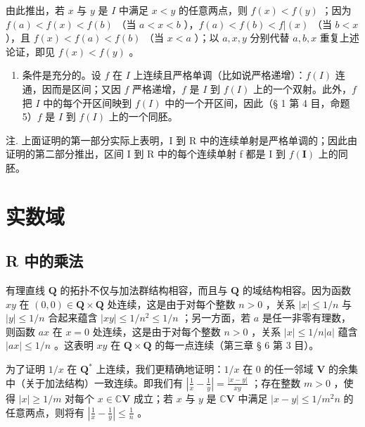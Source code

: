 由此推出，若 \(x\) 与 \(y\) 是 \(I\) 中满足 \(x < y\) 的任意两点，则 \(f(x) < f(y)\) ；因为 \(f(a) < f(x) < f(b)\) （当 \(a < x < b\) ），\(f(a) < f(b) < f|(x)\) （当 \(b < x\) ），且 \(f(x) < f(a) < f(b)\) （当 \(x < a\) ）；以 \(a, x, y\) 分别代替 \(a, b, x\) 重复上述论证，即见 \(f(x) < f(y)\) 。

\begin{enumerate}
\def\labelenumi{\arabic{enumi})}
\setcounter{enumi}{1}
\tightlist
\item
  条件是充分的。设 \(f\) 在 \(I\) 上连续且严格单调（比如说严格递增）：\(f(I)\) 连通，因而是区间；又因 \(f\) 严格递增，\(f\) 是 \(I\) 到 \(f(I)\) 上的一个双射。此外，\(f\) 把 \(I\) 中的每个开区间映到 \(f(I)\) 中的一个开区间，因此（§ 1 第 4 目，命题 5）\(f\) 是 \(I\) 到 \(f(I)\) 上的一个同胚。
\end{enumerate}

注. 上面证明的第一部分实际上表明，I 到 R 中的连续单射是严格单调的；因此由证明的第二部分推出，区间 I 到 R 中的每个连续单射 f 都是 I 到 \(f(\mathbf{I})\) 上的同胚。

\section{实数域}

\subsection{R 中的乘法}

有理直线 \(\mathbf{Q}\) 的拓扑不仅与加法群结构相容，而且与 \(\mathbf{Q}\) 的域结构相容。因为函数 \(xy\) 在 \((0, 0) \in \mathbf{Q} \times \mathbf{Q}\) 处连续，这是由于对每个整数 \(n > 0\) ，关系 \(|x| \leqslant 1/n\) 与 \(|y| \leqslant 1/n\) 合起来蕴含 \(|xy| \leqslant 1/n^2 \leqslant 1/n\) ；另一方面，若 \(a\) 是任一非零有理数，则函数 \(ax\) 在 \(x = 0\) 处连续，这是由于对每个整数 \(n > 0\) ，关系 \(|x| \leqslant 1/n |a|\) 蕴含 \(|ax| \leqslant 1/n\) 。这表明 \(xy\) 在 \(\mathbf{Q} \times \mathbf{Q}\) 的每一点连续（第三章 § 6 第 3 目）。

为了证明 \(1 / x\) 在 \(\mathbf{Q}^*\) 上连续，我们更精确地证明：\(1 / x\) 在 0 的任一邻域 \(\mathbf{V}\) 的余集中（关于加法结构）一致连续。即我们有 \(\left|\frac{1}{x} - \frac{1}{y}\right| = \frac{|x - y|}{xy}\) ；存在整数 \(m > 0\) ，使得 \(|x| \geqslant 1 / m\) 对每个 \(x \in \mathbb{C}\mathbf{V}\) 成立；若 \(x\) 与 \(y\) 是 \(\mathbb{C}\mathbf{V}\) 中满足 \(|x - y| \leqslant 1 / m^2 n\) 的任意两点，则将有 \(\left|\frac{1}{x} - \frac{1}{y}\right| \leqslant \frac{1}{n}\) 。

